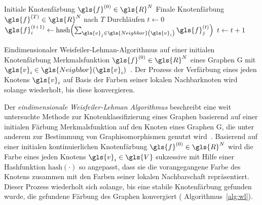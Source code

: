 \begin{algorithm}[t]
\centering
\begin{algorithmic}
  \REQUIRE{} Initiale Knotenfärbung $\gls{f}^{\left(0\right)} \in \gls{R}^N$
  \ENSURE{} Finale Knotenfärbung $\gls{f}^{\left(T\right)} \in \gls{R}^N$ nach $T$ Durchläufen
  \STATE{} $t \leftarrow 0$
  \REPEAT{}
      \STATE{} $\gls{f}^{\left(t+1\right)}_i \leftarrow \mathrm{hash}\left(\sum_{\gls{v}_j \in \gls{Neighbor}\left(\gls{v}_i\right)} \gls{f}^{\left(t\right)}_j\right)$
    \ENDFOR{}
    \STATE{} $t \leftarrow t + 1$
\end{algorithmic}
  \caption[Weisfeiler-Lehman]{Eindimensionaler Weisfeiler-Lehman-Algorithmus auf einer initialen Knotenfärbung \bzw{} Merkmalsfunktion $\gls{f}^{\left(0\right)} \in \gls{R}^N$ eines Graphen \gls{G} mit $\gls{v}_i \in \gls{Neighbor}\left(\gls{v}_i\right)$~\cite{wl}. Der Prozess der Verfärbung eines jeden Knotens $\gls{v}_i$ auf Basis der Farben seiner lokalen Nachbarknoten wird solange wiederholt, bis diese konvergieren.}
\label{alg:wl}
\end{algorithm}

Der \emph{eindimensionale Weis\-fei\-ler-Lehman Algorithmus} beschreibt eine weit untersuchte Methode zur Knotenklassifizierung eines Graphen basierend auf einer initialen Färbung \bzw{} Merkmalsfunktion auf den Knoten eines Graphen \gls{G}, die unter anderem zur Bestimmung von Graphisomorphismen genutzt wird~\cite{douglas}.
Basierend auf einer initialen kontinuierlichen Knotenfärbung $\gls{f}^{\left(0\right)} \in \gls{R}^N$ wird die Farbe eines jeden Knotens $\gls{v}_i \in \gls{V}$ sukzessive mit Hilfe einer Hashfunktion $\mathrm{hash}\left(\cdot\right)$ so angepasst, dass sie die vorangegangene Farbe des Knotens zusammen mit den Farben seiner lokalen Nachbarschaft repräsentiert.
Dieser Prozess wiederholt sich solange, bis eine stabile Knotenfärbung gefunden wurde, \dhe{} die gefundene Färbung des Graphen konvergiert (\vgl{} Algorithmus~\ref{alg:wl}).

